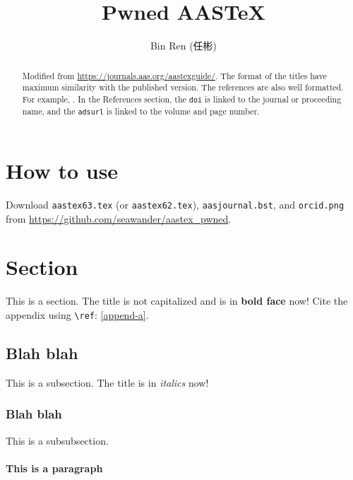 \documentclass[times, twocolumn]{aastex63}
\begin{document}
\begin{CJK*}{UTF8}{gbsn}
\title{Pwned AASTeX}
\author[0000-0003-1698-9696]{Bin Ren (任彬)}

\begin{abstract}
Modified from \url{https://journals.aas.org/aastexguide/}. The format of the titles have maximum similarity with the published version. The references are also well formatted. For example, \citet{ren17, ren18, ren18b, zhu16}. In the References section, the {\tt doi} is linked to the journal or proceeding name, and the {\tt adsurl} is linked to the volume and page number.


\end{abstract}


\section{How to use}
Download {\tt aastex63.tex} (or {\tt aastex62.tex}), {\tt aasjournal.bst}, and {\tt orcid.png} from \url{https://github.com/seawander/aastex_pwned}.


\section{Section}
This is a section. The title is not capitalized and is in \textbf{bold face} now! Cite the appendix using {\tt \textbackslash ref}: \ref{append-a}.

\subsection{Blah blah}
This is a subsection. The title  is in \textit{italics} now!

\subsubsection{Blah blah}
This is a subsubsection.

\paragraph{This is a paragraph} 




\end{CJK*}
\end{document}
